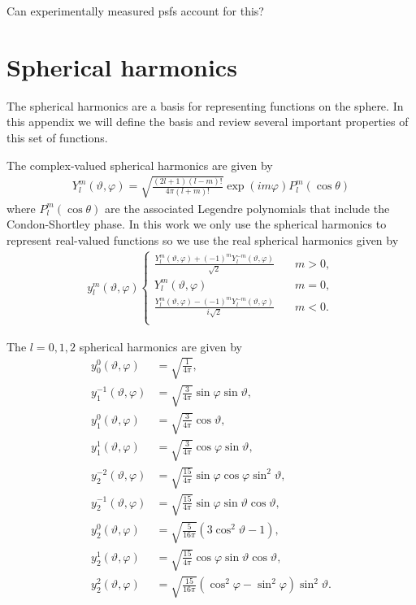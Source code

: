 \documentclass{osa-article}
\begin{document}
Can experimentally measured psfs account for this?


\appendix
\section{Spherical harmonics}\label{sec:sph}
The spherical harmonics are a basis for representing functions on the sphere. In
this appendix we will define the basis and review several important properties
of this set of functions. 

The complex-valued spherical harmonics are given by
\begin{align}
Y_l^m(\vartheta, \varphi) = \sqrt{\frac{(2l+1)(l-m)!}{4\pi(l+m)!}}\exp(i m \varphi)P_l^m\left(\cos\theta\right)
\end{align}
where $P_l^m(\cos\theta)$ are the associated Legendre polynomials that include
the Condon-Shortley phase. In this work we only use the spherical harmonics to
represent real-valued functions so we use the real spherical harmonics given by
\begin{align}
  y_l^m(\vartheta, \varphi)
  \begin{cases}
    \frac{Y_l^m(\vartheta, \varphi) + (-1)^m Y_l^{-m}(\vartheta, \varphi)}{\sqrt{2}} &\quad m > 0, \\
    Y_l^m(\vartheta, \varphi) &\quad m = 0, \\
    \frac{Y_l^m(\vartheta, \varphi) - (-1)^m Y_l^{-m}(\vartheta, \varphi)}{i \sqrt{2}} &\quad m < 0.\\
        \end{cases}
\end{align}

The $l=0, 1, 2$ spherical harmonics are given by
\begin{align}
  y_0^0(\vartheta, \varphi) &= \sqrt{\frac{1}{4\pi}}, \nonumber \\ 
  y_1^{-1}(\vartheta, \varphi) &= \sqrt{\frac{3}{4\pi}}\sin\varphi\sin\vartheta, \nonumber\\
  y_1^0(\vartheta, \varphi) &= \sqrt{\frac{3}{4\pi}}\cos\vartheta, \nonumber \\
  y_1^1(\vartheta, \varphi) &= \sqrt{\frac{3}{4\pi}}\cos\varphi\sin\vartheta, \nonumber \\
  y_2^{-2}(\vartheta, \varphi) &= \sqrt{\frac{15}{4\pi}}\sin\varphi\cos\varphi\sin^2\vartheta, \nonumber\\
  y_2^{-1}(\vartheta, \varphi) &= \sqrt{\frac{15}{4\pi}}\sin\varphi\sin\vartheta\cos\vartheta,\nonumber \\
  y_2^0(\vartheta, \varphi) &= \sqrt{\frac{5}{16\pi}}(3\cos^2\vartheta - 1), \nonumber \\ 
  y_2^{1}(\vartheta, \varphi) &= \sqrt{\frac{15}{4\pi}}\cos\varphi\sin\vartheta\cos\vartheta, \nonumber \\
  y_2^{2}(\vartheta, \varphi) &= \sqrt{\frac{15}{16\pi}}(\cos^2\varphi - \sin^2\varphi)\sin^2\vartheta. \label{eq:harmonics}
\end{align}
\end{document}
